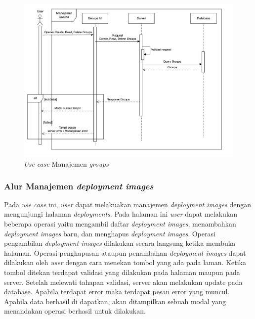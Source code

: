 \begin{figure}[ht]
  \centering
  \includegraphics[width=1\textwidth]{resources/chapter-3/usecase/uc-09.jpg}
  \caption{\textit{Use case} Manajemen \textit{groups}}
  \label{fig:usecase-09}
\end{figure}

\pagebreak

\subsubsection{Alur Manajemen \textit{deployment images}}

Pada \textit{use case} ini, \textit{user} dapat melakuakan manajemen \textit{deployment images} dengan mengunjungi halaman \textit{deployments}. Pada halaman ini \textit{user} dapat melakukan beberapa operasi yaitu mengambil daftar \textit{deployment images}, menambahkan \textit{deployment images} baru, dan menghapus \textit{deployment images}. Operasi pengambilan \textit{deployment images} dilakukan secara langsung ketika membuka halaman. Operasi penghapusan ataupun penambahan \textit{deployment images} dapat dilakukan oleh \textit{user} dengan cara menekan tombol yang ada pada laman. Ketika tombol ditekan terdapat validasi yang dilakukan pada halaman maupun pada server. Setelah melewati tahapan validasi, server akan melakukan update pada database. Apabila terdapat error maka terdapat pesan error yang muncul. Apabila data berhasil di dapatkan, akan ditampilkan sebuah modal yang menandakan operasi berhasil untuk dilakukan.


